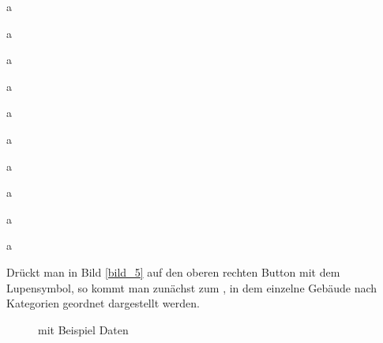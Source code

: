 \documentclass{report}
\begin{document}
a

a

a

a

a

a

a


a


a


a

Drückt man in Bild \ref{bild_5} auf den oberen rechten Button mit dem Lupensymbol, so kommt man zunächst zum , in dem einzelne Gebäude nach Kategorien geordnet dargestellt werden.

\begin{figure}[ht]\label{bild_6}
\centering {}
\caption{ mit Beispiel Daten}
\end{figure}
\end{document}
